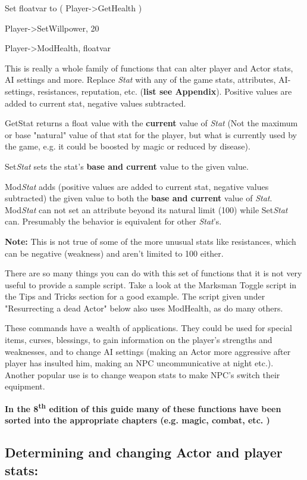 Set floatvar to ( Player-\textgreater GetHealth )

Player-\textgreater SetWillpower, 20

Player-\textgreater ModHealth, floatvar

This is really a whole family of functions that can alter player and
Actor stats, AI settings and more. Replace \emph{Stat} with any of the
game stats, attributes, AI-settings, resistances, reputation, etc.
(\textbf{list see Appendix}). Positive values are added to current stat,
negative values subtracted.

GetStat returns a float value with the \textbf{current} value of
\emph{Stat} (Not the maximum or base "natural" value of that stat for
the player, but what is currently used by the game, e.g. it could be
boosted by magic or reduced by disease).

Set\emph{Stat} sets the stat's \textbf{base and current} value to the
given value.

Mod\emph{Stat} adds (positive values are added to current stat, negative
values subtracted) the given value to both the \textbf{base and current}
value of \emph{Stat}. Mod\emph{Stat} can not set an attribute beyond its
natural limit (100) while Set\emph{Stat} can. Presumably the behavior is
equivalent for other \emph{Stat}'s.

\textbf{Note:} This is not true of some of the more unusual stats like
resistances, which can be negative (weakness) and aren't limited to 100
either.

There are so many things you can do with this set of functions that it
is not very useful to provide a sample script. Take a look at the
Marksman Toggle script in the Tips and Tricks section for a good
example. The script given under "Resurrecting a dead Actor" below also
uses ModHealth, as do many others.

These commands have a wealth of applications. They could be used for
special items, curses, blessings, to gain information on the player's
strengths and weaknesses, and to change AI settings (making an Actor
more aggressive after player has insulted him, making an NPC
uncommunicative at night etc.). Another popular use is to change weapon
stats to make NPC's switch their equipment.

\textbf{In the 8\textsuperscript{th} edition of this guide many of these
functions have been sorted into the appropriate chapters (e.g. magic,
combat, etc. )}

\hypertarget{determining-and-changing-actor-and-player-stats}{%
\subsection{\texorpdfstring{\hfill\break
Determining and changing Actor and player
stats:}{ Determining and changing Actor and player stats:}}\label{determining-and-changing-actor-and-player-stats}}

